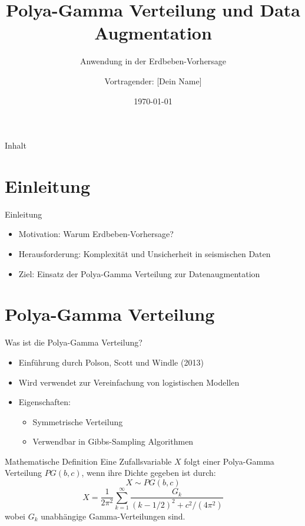 \documentclass{beamer}
\title{Polya-Gamma Verteilung und Data Augmentation}
\subtitle{Anwendung in der Erdbeben-Vorhersage}
\author{Vortragender: [Dein Name]}
\date{\today}
\begin{document}
\begin{frame}
  \titlepage
\end{frame}

\begin{frame}{Inhalt}
  \tableofcontents
\end{frame}

\section{Einleitung}
\begin{frame}{Einleitung}
  \begin{itemize}
    \item Motivation: Warum Erdbeben-Vorhersage?
    \item Herausforderung: Komplexität und Unsicherheit in seismischen Daten
    \item Ziel: Einsatz der Polya-Gamma Verteilung zur Datenaugmentation
  \end{itemize}
\end{frame}

\section{Polya-Gamma Verteilung}
\begin{frame}{Was ist die Polya-Gamma Verteilung?}
  \begin{itemize}
    \item Einführung durch Polson, Scott und Windle (2013)
    \item Wird verwendet zur Vereinfachung von logistischen Modellen
    \item Eigenschaften:
    \begin{itemize}
      \item Symmetrische Verteilung
      \item Verwendbar in Gibbs-Sampling Algorithmen
    \end{itemize}
  \end{itemize}
\end{frame}

\begin{frame}{Mathematische Definition}
  Eine Zufallsvariable $X$ folgt einer Polya-Gamma Verteilung $PG(b, c)$, wenn ihre Dichte gegeben ist durch:
  \[ X \sim PG(b, c) \]
  \[ X = \frac{1}{2 \pi^2} \sum_{k=1}^{\infty} \frac{G_k}{(k-1/2)^2 + c^2/(4\pi^2)} \]
  wobei $G_k$ unabhängige Gamma-Verteilungen sind.
\end{frame}
\end{document}
